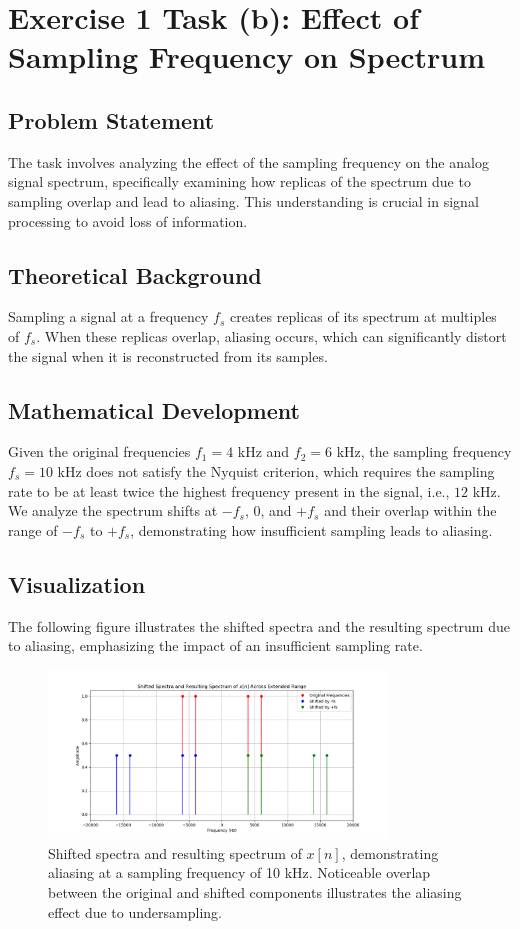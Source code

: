 \item[b]
\section*{Exercise 1 Task (b): Effect of Sampling Frequency on Spectrum}

\subsection*{Problem Statement}
The task involves analyzing the effect of the sampling frequency on the analog signal spectrum, specifically examining how replicas of the spectrum due to sampling overlap and lead to aliasing. This understanding is crucial in signal processing to avoid loss of information.

\subsection*{Theoretical Background}
Sampling a signal at a frequency $f_s$ creates replicas of its spectrum at multiples of $f_s$. When these replicas overlap, aliasing occurs, which can significantly distort the signal when it is reconstructed from its samples.

\subsection*{Mathematical Development}
Given the original frequencies $f_1 = 4$ kHz and $f_2 = 6$ kHz, the sampling frequency $f_s = 10$ kHz does not satisfy the Nyquist criterion, which requires the sampling rate to be at least twice the highest frequency present in the signal, i.e., $12$ kHz. We analyze the spectrum shifts at $-f_s$, $0$, and $+f_s$ and their overlap within the range of $-f_s$ to $+f_s$, demonstrating how insufficient sampling leads to aliasing.

\subsection*{Visualization}
The following figure illustrates the shifted spectra and the resulting spectrum due to aliasing, emphasizing the impact of an insufficient sampling rate.

\begin{figure}[h]
    \centering
    \includegraphics[width=0.8\textwidth]{fig/ex1_b_plot.png}
    \caption{Shifted spectra and resulting spectrum of $x[n]$, demonstrating aliasing at a sampling frequency of 10 kHz. Noticeable overlap between the original and shifted components illustrates the aliasing effect due to undersampling.}
    \label{fig:ex1b_spectrum}
\end{figure}

